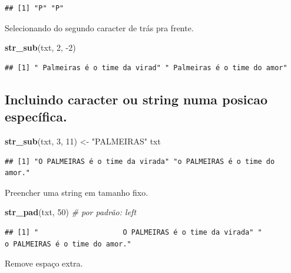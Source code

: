 \documentclass[]{book}
\newenvironment{Shaded}{\begin{snugshade}}{\end{snugshade}}
\newcommand{\CommentTok}[1]{\textcolor[rgb]{0.56,0.35,0.01}{\textit{#1}}}
\newcommand{\DecValTok}[1]{\textcolor[rgb]{0.00,0.00,0.81}{#1}}
\newcommand{\KeywordTok}[1]{\textcolor[rgb]{0.13,0.29,0.53}{\textbf{#1}}}
\newcommand{\NormalTok}[1]{#1}
\newcommand{\StringTok}[1]{\textcolor[rgb]{0.31,0.60,0.02}{#1}}
\begin{document}
\begin{verbatim}
## [1] "P" "P"
\end{verbatim}

Selecionando do segundo caracter de trás pra frente.

\begin{Shaded}
\begin{Highlighting}[]
\KeywordTok{str_sub}\NormalTok{(txt, }\DecValTok{2}\NormalTok{, }\DecValTok{-2}\NormalTok{)}
\end{Highlighting}
\end{Shaded}

\begin{verbatim}
## [1] " Palmeiras é o time da virad" " Palmeiras é o time do amor"
\end{verbatim}

\hypertarget{incluindo-caracter-ou-string-numa-posicao-especuxedfica.}{%
\subsection{Incluindo caracter ou string numa posicao específica.}\label{incluindo-caracter-ou-string-numa-posicao-especuxedfica.}}

\begin{Shaded}
\begin{Highlighting}[]
\KeywordTok{str_sub}\NormalTok{(txt, }\DecValTok{3}\NormalTok{, }\DecValTok{11}\NormalTok{) <-}\StringTok{ "PALMEIRAS"}
\NormalTok{txt}
\end{Highlighting}
\end{Shaded}

\begin{verbatim}
## [1] "O PALMEIRAS é o time da virada" "o PALMEIRAS é o time do amor."
\end{verbatim}

Preencher uma string em tamanho fixo.

\begin{Shaded}
\begin{Highlighting}[]
\KeywordTok{str_pad}\NormalTok{(txt, }\DecValTok{50}\NormalTok{) }\CommentTok{# por padrão: left}
\end{Highlighting}
\end{Shaded}

\begin{verbatim}
## [1] "                    O PALMEIRAS é o time da virada" "                     o PALMEIRAS é o time do amor."
\end{verbatim}

Remove espaço extra.
\end{document}
